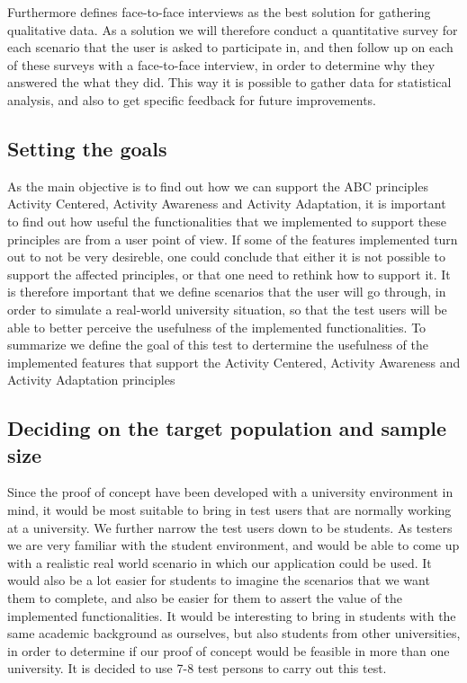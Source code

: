 Furthermore \citet{ugur2001} defines face-to-face interviews as the best solution for gathering qualitative data. As a solution we will therefore conduct a quantitative survey for each scenario that the user is asked to participate in, and then follow up on each of these surveys with a face-to-face interview, in order to determine why they answered the what they did. This way it is possible to gather data for statistical analysis, and also to get specific feedback for future improvements.

\subsection{Setting the goals}
As the main objective is to find out how we can support the ABC principles Activity Centered, Activity Awareness and Activity Adaptation, it is important to find out how useful the functionalities that we implemented to support these principles are from a user point of view. If some of the features implemented turn out to not be very desireble, one could conclude that either it is not possible to support the affected principles, or that one need to rethink how to support it. It is therefore important that we define scenarios that the user will go through, in order to simulate a real-world university situation, so that the test users will be able to better perceive the usefulness of the implemented functionalities.
To summarize we define the goal of this test to dertermine the usefulness of the implemented features that support the Activity Centered, Activity Awareness and Activity Adaptation principles

\subsection{Deciding on the target population and sample size}
Since the proof of concept have been developed with a university environment in mind, it would be most suitable to bring in test users that are normally working at a university. We further narrow the test users down to be students. As testers we are very familiar with the student environment, and would be able to come up with a realistic real world scenario in which our application could be used. It would also be a lot easier for students to imagine the scenarios that we want them to complete, and also be easier for them to assert the value of the implemented functionalities. It would be interesting to bring in students with the same academic background as ourselves, but also students from other universities, in order to determine if our proof of concept would be feasible in more than one university. It is decided to use 7-8 test persons to carry out this test.

